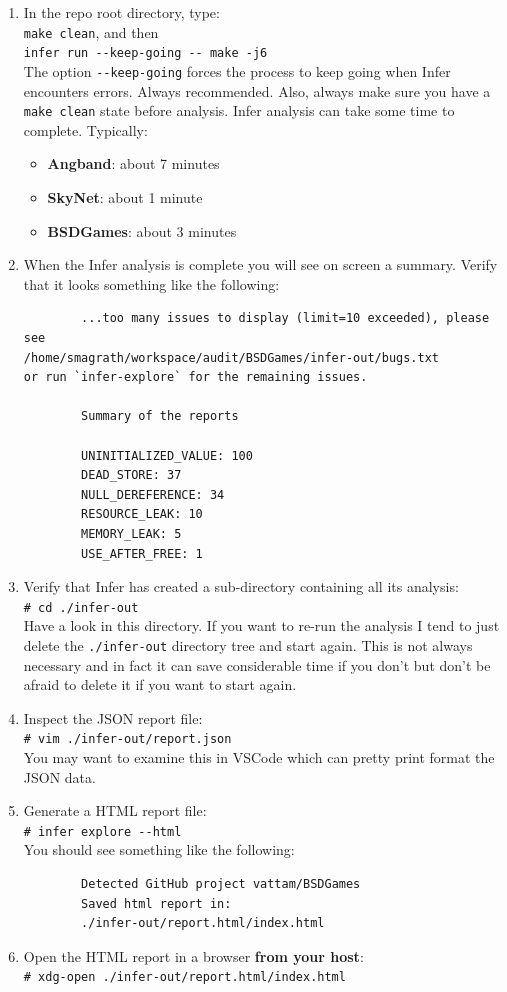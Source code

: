 \begin{enumerate}
	\itemsep0em
	\item In the repo root directory, type:\\
	\verb|make clean|, and then \\
	\verb|infer run --keep-going -- make -j6|\\
    The option \verb|--keep-going| forces the process to keep going when Infer encounters errors. Always recommended. Also, always make sure you have a \verb|make clean| state before analysis.    
    Infer analysis can take some time to complete. Typically:
    \begin{itemize}
    	\item \textbf{Angband}: about 7 minutes
    	\item \textbf{SkyNet}: about 1 minute
    	\item \textbf{BSDGames}: about 3 minutes
    \end{itemize}
	\item When the Infer analysis is complete you will see on screen a summary. 
	Verify that it looks something like the following:\\
	\begin{verbatim}		
		...too many issues to display (limit=10 exceeded), please see
/home/smagrath/workspace/audit/BSDGames/infer-out/bugs.txt 
or run `infer-explore` for the remaining issues.
		
		Summary of the reports
		
		UNINITIALIZED_VALUE: 100
		DEAD_STORE: 37
		NULL_DEREFERENCE: 34
		RESOURCE_LEAK: 10
		MEMORY_LEAK: 5
		USE_AFTER_FREE: 1		
	\end{verbatim}
	\item Verify that Infer has created a sub-directory containing all its analysis:\\
	\verb|# cd ./infer-out|\\
	Have a look in this directory. If you want to re-run the analysis I tend to just 
	delete the \verb|./infer-out| directory tree and start again. This is not always necessary
	and in fact it can save considerable time if you don't but don't be afraid to delete it if you want 
	to start again.
	\item Inspect the JSON report file:\\
	\verb|# vim ./infer-out/report.json|\\
    You may want to examine this in VSCode which can pretty print format the JSON data. 
	\item Generate a HTML report file:\\
	\verb|# infer explore --html| \\
	You should see something like the following:
	\begin{verbatim}
		Detected GitHub project vattam/BSDGames
		Saved html report in:
		./infer-out/report.html/index.html
	\end{verbatim}
	\item Open the HTML report in a browser \textbf{from your host}:\\
	\verb|# xdg-open ./infer-out/report.html/index.html|
\end{enumerate}

